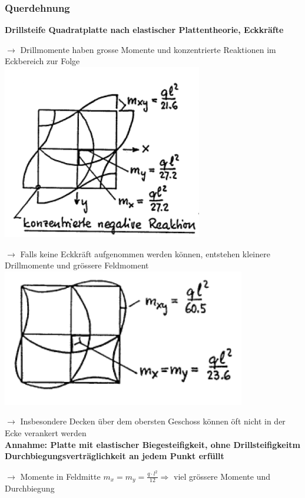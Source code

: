 	\begin{minipage}{0.5\linewidth}
		
		\subsubsection{Querdehnung}
			\textbf{Drillsteife Quadratplatte nach elastischer Plattentheorie, Eckkräfte} 
			
			$ \rightarrow $ Drillmomente haben grosse Momente und konzentrierte Reaktionen im Eckbereich zur Folge \\
			\includegraphics[width=0.5\linewidth]{images/DW5Querdehnung.PNG} 
			
			$ \rightarrow $ Falls keine Eckkräft aufgenommen werden können, entstehen kleinere Drillmomente und grössere Feldmoment \\
			\includegraphics[width=0.5\linewidth]{images/DW6Querdehnung.PNG}
			
			$ \rightarrow $ Insbesondere Decken über dem obersten Geschoss können öft nicht in der Ecke verankert werden \\
			
			\textbf{Annahme: Platte mit elastischer Biegesteifigkeit, ohne Drillsteifigkeitm Durchbiegungsverträglichkeit an jedem Punkt erfüllt}
			
			$ \rightarrow $ Momente in Feldmitte $ m_x = m_y = \frac{q \cdot l^2}{12} \Rightarrow $ viel grössere Momente und Durchbiegung \\
		
	\end{minipage}
